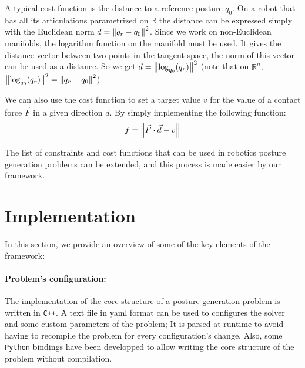 A typical cost function is the distance to a reference posture $q_0$.
On a robot that has all its articulations parametrized on $\mathbb{R}$ the distance can be expressed simply with the Euclidean norm $d = \left\| q_r-q_0 \right\|^2$.
Since we work on non-Euclidean manifolds, the logarithm function on the manifold must be used.
It gives the distance vector between two points in the tangent space, the norm of this vector can be used as a distance.
So we get $d = \left\| \text{log}_{q_0}(q_r) \right\|^2$ (note that on $\mathbb{R}^n$, $\left\| \text{log}_{q_0}(q_r) \right\|^2 = \left\| q_r - q_0 \right\|^2$)

We can also use the cost function to set a target value $v$ for the value of a contact force $\vec{F}$ in a given direction $d$. By simply implementing the following function:
\begin{equation}
  f = \left\| \vec{F}\cdot\vec{d}-v \right\|
\end{equation}

The list of constraints and cost functions that can be used in robotics posture generation problems can be extended, and this process is made easier by our framework.



\section{Implementation}
\label{sec:implementation}

In this section, we provide an overview of some of the key elements of the framework:

\paragraph{Problem's configuration:}
The implementation of the core structure of a posture generation problem is written in \texttt{C++}.
A text file in yaml format can be used to configures the solver and some custom parameters of the problem; It is parsed at runtime to avoid having to recompile the problem for every configuration's change.
Also, some \texttt{Python} bindings have been developped to allow writing the core structure of the problem without compilation.

